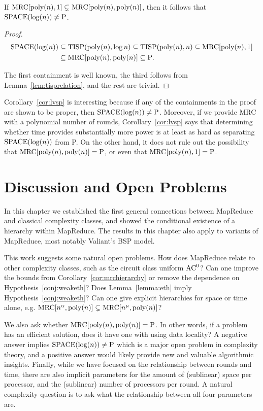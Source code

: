 \begin{corollary} \label{cor:lvsp}
If $\textup{MRC}[\textup{poly}(n), 1] \subsetneq \textup{MRC}[\textup{poly}(n),
\textup{poly}(n)]$, then it follows that $\textup{SPACE}(\log(n)) \neq \textup{P}$.
\end{corollary}

\begin{proof}
\begin{align*}	\textup{SPACE}(\log(n)) &\subseteq \textup{TISP}(\textup{poly}(n), \log n) \subseteq
\textup{TISP}(\textup{poly}(n), n) \subseteq \textup{MRC}[\textup{poly}(n), 1] \\ &\subseteq
\textup{MRC}[\textup{poly}(n), \textup{poly}(n)] \subseteq \textup{P}.\end{align*}

The first containment is well known, the third follows from 
Lemma~\ref{lem:tisprelation}, and the rest are trivial.
\end{proof}

Corollary~\ref{cor:lvsp} is interesting because if any of the containments in
the proof are shown to be proper, then $\textup{SPACE}(\log(n)) \neq \textup{P}$. Moreover, if we provide
MRC with a polynomial number of rounds, Corollary~\ref{cor:lvsp} says that
determining whether time provides substantially more power is at least as hard
as separating $\textup{SPACE}(\log(n))$ from P. On the other hand, it does not rule out the possibility
that $\textup{MRC}[\textup{poly}(n), \textup{poly}(n)] = \textup{P}$, or even that
$\textup{MRC}[\textup{poly}(n), 1] = \textup{P}$.

\section{Discussion and Open Problems}\label{sec:openproblems}

In this chapter we established the first general connections between MapReduce
and classical complexity classes, and showed the conditional existence of a
hierarchy within MapReduce. The results in this chapter also apply to variants
of MapReduce, most notably Valiant's BSP model.  

This work suggests some natural open problems. How does MapReduce relate to
other complexity classes, such as the circuit class uniform $\textup{AC}^0$?
Can one improve the bounds from Corollary~\ref{cor:mrchierarchy} or remove the
dependence on Hypothesis~\ref{conj:weaketh}? Does Lemma~\ref{lemma:eth} imply
Hypothesis~\ref{conj:weaketh}? Can one give explicit hierarchies for space or
time alone, e.g. $\textup{MRC}[n^\alpha, \text{poly}(n)] \subsetneq \textup{MRC}[n^\mu,
\text{poly}(n)]$?

We also ask whether $\textup{MRC}[\text{poly}(n), \text{poly}(n)] = \textup{P}$. In other
words, if a problem has an efficient solution, does it have one with using data
locality? A negative answer implies $\textup{SPACE}(\log(n))\neq\textup{P}$ which is a major open problem in
complexity theory, and a positive answer would likely provide new and valuable
algorithmic insights. Finally, while we have focused on the relationship
between rounds and time, there are also implicit parameters for the amount of
(sublinear) space per processor, and the (sublinear) number of processors per
round. A natural complexity question is to ask what the relationship
between all four parameters are.

